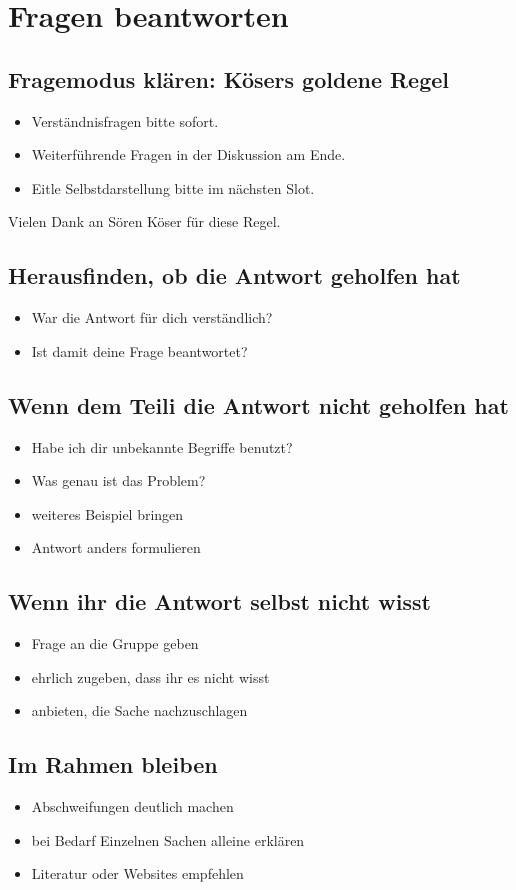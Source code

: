\section{Fragen beantworten}
\label{fragen-beantworten}

\subsection{Fragemodus klären: Kösers goldene Regel}
\begin{itemize}
    \item Verständnisfragen bitte sofort.
    \item Weiterführende Fragen in der Diskussion am Ende.
    \item Eitle Selbstdarstellung bitte im nächsten Slot.
\end{itemize}

Vielen Dank an Sören Köser für diese Regel.

\subsection{Herausfinden, ob die Antwort geholfen hat}
\begin{itemize}
    \item War die Antwort für dich verständlich?
    \item Ist damit deine Frage beantwortet?
\end{itemize}

\subsection{Wenn dem Teili die Antwort nicht geholfen hat}
\begin{itemize}
    \item Habe ich dir unbekannte Begriffe benutzt?
    \item Was genau ist das Problem?
    \item weiteres Beispiel bringen
    \item Antwort anders formulieren
\end{itemize}

\subsection{Wenn ihr die Antwort selbst nicht wisst}
\begin{itemize}
    \item Frage an die Gruppe geben
    \item ehrlich zugeben, dass ihr es nicht wisst
    \item anbieten, die Sache nachzuschlagen
\end{itemize}

\subsection{Im Rahmen bleiben}
\begin{itemize}
    \item Abschweifungen deutlich machen
    \item bei Bedarf Einzelnen Sachen alleine erklären
    \item Literatur oder Websites empfehlen
\end{itemize}

